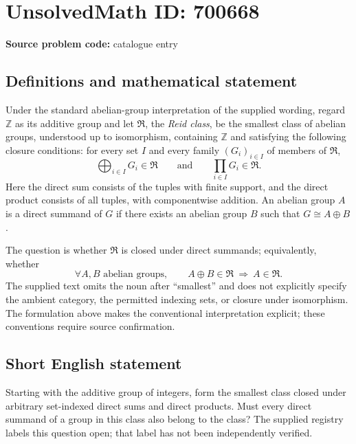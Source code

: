 \documentclass[11pt]{article}
\newcommand{\Z}{\mathbb{Z}}
\begin{document}
\section*{UnsolvedMath ID: 700668}
\textbf{Source problem code:} catalogue entry
\subsection{Definitions and mathematical statement}
Under the standard abelian-group interpretation of the supplied wording, regard \(\Z\) as its additive group and let \(\mathfrak R\), the \emph{Reid class}, be the smallest class of abelian groups, understood up to isomorphism, containing \(\Z\) and satisfying the following closure conditions: for every set \(I\) and every family \((G_i)_{i\in I}\) of members of \(\mathfrak R\),
\[
\bigoplus_{i\in I}G_i\in\mathfrak R
\qquad\text{and}\qquad
\prod_{i\in I}G_i\in\mathfrak R.
\]
Here the direct sum consists of the tuples with finite support, and the direct product consists of all tuples, with componentwise addition. An abelian group \(A\) is a direct summand of \(G\) if there exists an abelian group \(B\) such that \(G\cong A\oplus B\).

The question is whether \(\mathfrak R\) is closed under direct summands; equivalently, whether
\[
\forall A,B\text{ abelian groups},\qquad
A\oplus B\in\mathfrak R\ \Longrightarrow\ A\in\mathfrak R.
\]
The supplied text omits the noun after ``smallest'' and does not explicitly specify the ambient category, the permitted indexing sets, or closure under isomorphism. The formulation above makes the conventional interpretation explicit; these conventions require source confirmation.
\subsection{Short English statement}
Starting with the additive group of integers, form the smallest class closed under arbitrary set-indexed direct sums and direct products. Must every direct summand of a group in this class also belong to the class? The supplied registry labels this question open; that label has not been independently verified.
\end{document}
